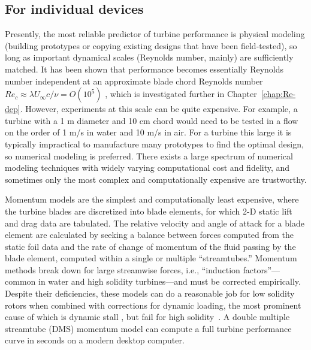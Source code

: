 \subsection{For individual devices}

Presently, the most reliable predictor of turbine performance is physical
modeling (building prototypes or copying existing designs that have been
field-tested), so long as important dynamical scales (Reynolds number, mainly)
are sufficiently matched. It has been shown that performance becomes essentially
Reynolds number independent at an approximate blade chord Reynolds number $Re_c
\approx \lambda U_\infty c / \nu = O(10^5)$ \cite{Bravo2007}, which is
investigated further in Chapter~\ref{chap:Re-dep}. However, experiments at this
scale can be quite expensive. For example, a turbine with a 1 m diameter and 10
cm chord would need to be tested in a flow on the order of 1 m/s in water and 10
m/s in air. For a turbine this large it is typically impractical to manufacture
many prototypes to find the optimal design, so numerical modeling is preferred.
There exists a large spectrum of numerical modeling techniques with widely
varying computational cost and fidelity, and sometimes only the most complex and
computationally expensive are trustworthy.

Momentum models are the simplest and computationally least expensive, where the
turbine blades are discretized into blade elements, for which 2-D static lift
and drag data are tabulated. The relative velocity and angle of attack for a
blade element are calculated by seeking a balance between forces computed from
the static foil data and the rate of change of momentum of the fluid passing by
the blade element, computed within a single or multiple ``streamtubes.''
Momentum methods break down for large streamwise forces, i.e., ``induction
factors''---common in water and high solidity turbines---and must be corrected
empirically. Despite their deficiencies, these models can do a reasonable job
for low solidity rotors when combined with corrections for dynamic loading, the
most prominent cause of which is dynamic stall \cite{Para2002}, but fail for
high solidity~\cite{Joo2015}. A double multiple streamtube (DMS) momentum model
can compute a full turbine performance curve in seconds on a modern desktop
computer.

